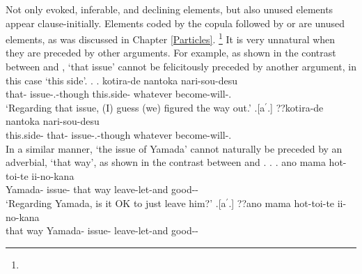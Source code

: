 Not only evoked, inferable, and declining elements,
but also unused elements appear clause-initially.
Elements coded by the copula followed by  or  are unused elements, as was discussed in Chapter \ref{Particles}.%
 \footnote{
 }
It is very unnatural when they are preceded by other arguments.
For example,
as shown in the contrast between \Next[a] and \Next[b],
 `that issue' cannot be felicitously preceded by another argument, in this case  `this side'.
%
\ex.
 \ag.   kotira-de nantoka nari-sou-desu \\
      that- issue-.-though this.side- whatever become-will-. \\
      `Regarding that issue, (I) guess (we) figured the way out.'
      \hfill{\cite[modified from][283]{niwa06}}
 \bg.[a$^{\prime}$.] ??kotira-de   nantoka nari-sou-desu \\
      this.side- that- issue-.-though whatever become-will-. \\

In a similar manner,
 `the issue of Yamada' cannot naturally be preceded by an adverbial,  `that way',
as shown in the contrast between \Next[a] and \Next[b].
%
\ex.
 \ag.   ano mama hot-toi-te ii-no-kana \\
      Yamada- issue- that way leave-let-and good-- \\
      `Regarding Yamada, is it OK to just leave him?'
      \hfill{\cite[283]{niwa06}}
 \bg.[a$^{\prime}$.] ??ano mama   hot-toi-te ii-no-kana \\
      that way Yamada- issue- leave-let-and good-- \\



